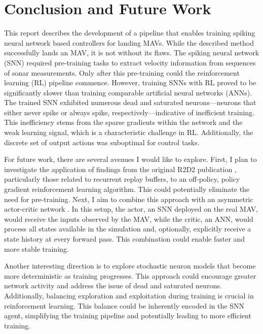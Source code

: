 \section{Conclusion and Future Work}
This report describes the development of a pipeline that enables training spiking neural network based controllers for landing MAVs.
While the described method successfully lands an MAV, it is not without its flaws. The spiking neural network (SNN) required pre-training tasks to extract velocity information from sequences of sonar measurements. Only after this pre-training could the reinforcement learning (RL) pipeline commence. However, training SNNs with RL proved to be significantly slower than training comparable artificial neural networks (ANNs). The trained SNN exhibited numerous dead and saturated neurons—neurons that either never spike or always spike, respectively—indicative of inefficient training. This inefficiency stems from the sparse gradients within the network and the weak learning signal, which is a characteristic challenge in RL. Additionally, the discrete set of output actions was suboptimal for control tasks. 

For future work, there are several avenues I would like to explore. First, I plan to investigate the application of findings from the original R2D2 publication \cite{kapturowski2018recurrent_r2d2}, particularly those related to recurrent replay buffers, to an off-policy, policy gradient reinforcement learning algorithm. This could potentially eliminate the need for pre-training. Next, I aim to combine this approach with an asymmetric actor-critic network \cite{pinto2017asymmetric}. In this setup, the actor, an SNN deployed on the real MAV, would receive the inputs observed by the MAV, while the critic, an ANN, would process all states available in the simulation and, optionally, explicitly receive a state history at every forward pass. This combination could enable faster and more stable training.

Another interesting direction is to explore stochastic neuron models that become more deterministic as training progresses. This approach could encourage greater network activity and address the issue of dead and saturated neurons. Additionally, balancing exploration and exploitation during training is crucial in reinforcement learning. This balance could be inherently encoded in the SNN agent, simplifying the training pipeline and potentially leading to more efficient training.